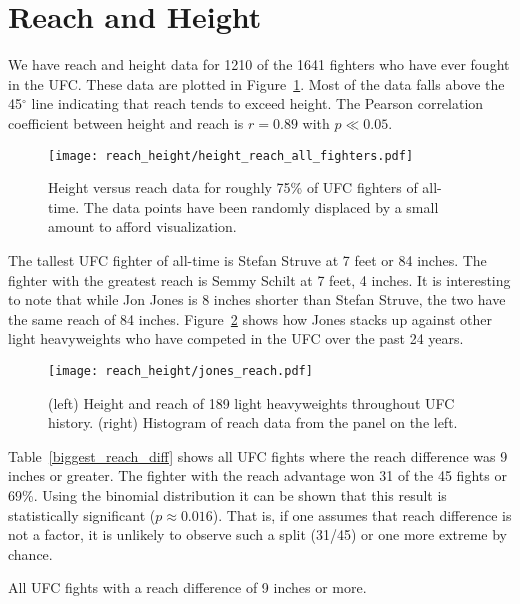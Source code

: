 \clearpage
\section{Reach and Height}
We have reach and height data for 1210 of the 1641 fighters who have ever fought in the
UFC. These data are plotted in Figure~\ref{height_reach_all_fighters}. Most of
the data falls above the 45$^{\circ}$ line indicating that
reach tends to exceed height. The Pearson correlation coefficient between height
and reach is $r=0.89$ with $p\ll 0.05$.

\begin{figure}[h]
\begin{center}
\texttt{[image: reach\_height/height\_reach\_all\_fighters.pdf]}
\caption{Height versus reach data for roughly 75\% of UFC fighters
of all-time. The data points have been randomly displaced
by a small amount to afford visualization.}
\label{height_reach_all_fighters}
\end{center}
\end{figure}

The tallest UFC fighter of all-time is Stefan Struve at 7 feet or 84 inches. The fighter
with the greatest reach is Semmy Schilt at 7 feet, 4 inches. It is interesting
to note that while Jon Jones is 8 inches shorter than
Stefan Struve, the two have the same reach of 84 inches. Figure~\ref{jones_reach} shows
how Jones stacks up against other light heavyweights who have competed in the UFC
over the past 24 years.

\begin{figure}[h]
\begin{center}
\texttt{[image: reach\_height/jones\_reach.pdf]}
\caption{(left) Height and reach of 189 light heavyweights throughout
UFC history.
(right) Histogram of reach data from the panel on the left.}
\label{jones_reach}
\end{center}
\end{figure}

Table~\ref{biggest_reach_diff} shows all UFC fights where the reach difference
was 9 inches or greater. The fighter with the
reach advantage won 31 of the 45 fights or 69\%. Using the
binomial distribution it can be shown that this result is
statistically significant ($p\approx0.016$). That is, if one
assumes that reach difference is not a factor, it is unlikely to observe
such a split (31/45) or one more extreme by chance.

\begin{center}
\begin{table}[h]

\caption{All UFC fights with a reach difference of 9 inches or more.}
\label{biggest_reach_diff}
\end{table}
\end{center}

